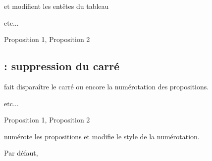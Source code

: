 \medskip
{} et  modifient les  entêtes du tableau

\begin{minipage}[c][][t]{.45\linewidth}
\begin{tkzexample}
  \begin{alterqcm}%
  [lq=3cm,tone=titre n°1,%
   ttwo=titre n°2]
  etc...
  \end{alterqcm}\end{tkzexample}
\end{minipage}\hfill
\begin{minipage}[c][][t]{.45\linewidth}
  \begin{alterqcm}%
  [lq   = 3cm,
   tone = titre n°1,
   ttwo = titre n°2]
  {%
  {Proposition 1},
  {Proposition 2}
  }
  \end{alterqcm}
\end{minipage}

\subsection{ : suppression du carré }

 fait disparaître le carré ou encore la numérotation des propositions.

\begin{minipage}[c][][t]{.45\linewidth}
\begin{tkzexample}
  \begin{alterqcm}
  [lq=3cm,nosquare=true]
  etc...
  \end{alterqcm}\end{tkzexample}
\end{minipage}\hfill
\begin{minipage}[c][][t]{.45\linewidth}
  \begin{alterqcm}
  [lq=3cm,nosquare=true]
  {%
  {Proposition 1},
  {Proposition 2}
  }
  \end{alterqcm}
\end{minipage}

\medskip
{} numérote les propositions et   modifie le style de la numérotation. 

Par défaut, 

